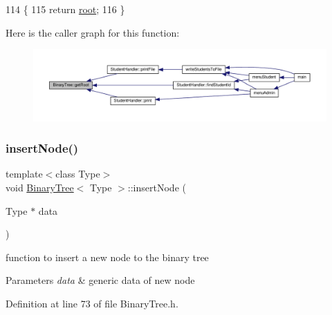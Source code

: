 \begin{DoxyCode}
114                                       \{
115         \textcolor{keywordflow}{return} \hyperlink{class_binary_tree_a8744322abfc99966f7d23d8560ed5702}{root};
116     \}
\end{DoxyCode}
Here is the caller graph for this function\+:
\nopagebreak
\begin{figure}[H]
\begin{center}
\leavevmode
\includegraphics[width=350pt]{class_binary_tree_a9ee0cf09781cf2ecc471aacc61848dde_icgraph}
\end{center}
\end{figure}
\mbox{\label{class_binary_tree_a69ae782d438253d40cbd194737feca17}} 
\subsubsection{\texorpdfstring{insert\+Node()}{insertNode()}}
{\footnotesize\ttfamily template$<$class Type$>$ \\
void \hyperlink{class_binary_tree}{Binary\+Tree}$<$ Type $>$\+::insert\+Node (\begin{DoxyParamCaption}\item[{Type $\ast$}]{data }\end{DoxyParamCaption})\hspace{0.3cm}{\ttfamily [inline]}}

function to insert a new node to the binary tree 
\begin{DoxyParams}{Parameters}
{\em data} & generic data of new node \\
\hline
\end{DoxyParams}


Definition at line 73 of file Binary\+Tree.\+h.


